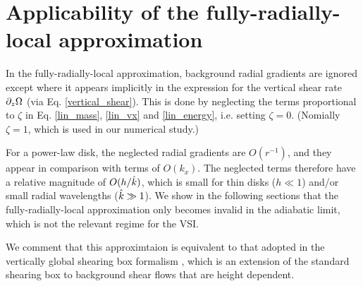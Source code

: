 


      



\section{Applicability of the fully-radially-local approximation}\label{global_corr}
In the fully-radially-local approximation, background radial
gradients are ignored except where it appears
implicitly in the expression for the vertical shear rate $\partial_z\Omega$
(via Eq. \ref{vertical_shear}).  This is done by neglecting the terms proportional to $\zeta$
in Eq. \ref{lin_mass}, \ref{lin_vx} and \ref{lin_energy}, i.e. setting 
$\zeta=0$. (Nomially $\zeta=1$, which is used in our numerical study.) 


For a power-law disk, the neglected radial gradients   
are $O(r^{-1})$, and they appear in comparison with terms of
$O(k_x)$. The neglected terms therefore have a relative magnitude of
$O(h/\hat{k})$, which is small for thin disks ($h\ll1$) 
and/or small radial wavelengths ($\hat{k}\gg 1$).  We show in the
following sections that the fully-radially-local approximation only 
becomes invalid in the adiabatic limit, which is not the relevant
regime for the VSI. 

We comment that this approximtaion is equivalent to 
that adopted in the vertically global shearing box formalism
, which is an 
extension of the standard shearing box \citep{goldreich65} to
background shear flows that are height dependent.

